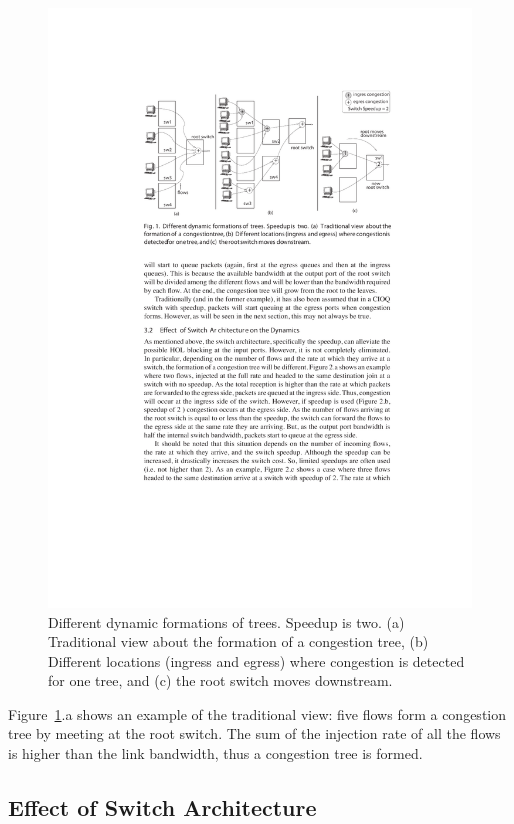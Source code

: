 \begin{figure}[ht]
	\centering
		\includegraphics{figures/congestion_dynamics.pdf}
		\caption{Different dynamic formations of trees. Speedup is two. (a) Traditional view about the formation of a congestion tree, (b) Different locations (ingress and egress) where congestion is detected for one tree, and (c) the root switch moves downstream.}
		\label{fig:congestion_dynamics}
\end{figure}

Figure~\ref{fig:congestion_dynamics}.a shows an example of the traditional view: five flows form a congestion tree by meeting at the root switch. The sum of the injection rate of all the flows is higher than the link bandwidth, thus a congestion tree is formed.

\subsection{Effect of Switch Architecture}\label{S:switch_arch}

